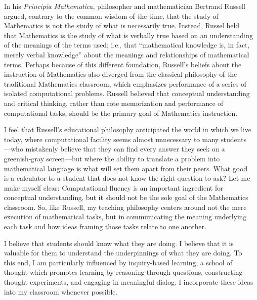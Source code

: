 \documentclass[11pt]{article}
\begin{document}

\makeletterhead

\maketitle

\vfill

In his \emph{Principia Mathematica,} philosopher and mathematician
Bertrand Russell argued, contrary to the common wisdom of the time,
that the study of Mathematics is not the study of what is necessarily
true.
Instead, Russel held that Mathematics is the study of what is verbally
true based on an understanding of the meanings of the terms used; i.e.,
that ``mathematical knowledge is, in fact, merely verbal knowledge''
about the meanings and relationships of mathematical terms.
Perhaps because of this different foundation, Russell's beliefs about
the instruction of Mathematics also diverged from the classical
philosophy of the traditional Mathematics classroom, which emphasizes
performance of a series of isolated computational problems.
Russell believed that conceptual understanding and critical thinking,
rather than rote memorization and performance of computational tasks,
should be the primary goal of Mathematics instruction.

I feel that Russell's educational philosophy anticipated the world in
which we live today, where computational facility seems almost
unnecessary to many students---who mistakenly believe that they can find
every answer they seek on a greenish-gray screen---but where the ability
to translate a problem into mathematical language is what will set them
apart from their peers. What good is a calculator to a student that does
not know the right question to ask? Let me make myself clear:
Computational fluency is an important ingredient for conceptual
understanding, but it should not be the sole goal of the Mathematics
classroom. So, like Russell, my teaching philosophy centers around not
the mere execution of mathematical tasks, but in communicating the
meaning underlying each task and how ideas framing those tasks relate
to one another.

I believe that students should know what they are doing. I believe that
it is valuable for them to understand the underpinnings of what they are
doing. To this end, I am particularly influenced by inquiry-based
learning, a school of thought which promotes learning by reasoning
through questions, constructing thought experiments, and engaging in
meaningful dialog. I incorporate these ideas into my classroom whenever
possible.
\end{document}

